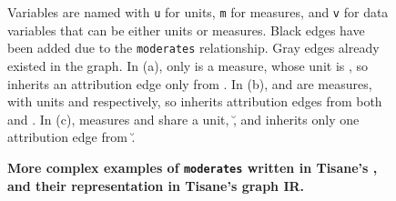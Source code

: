 {\begin{figure}[H]
       \caption{\textbf{More complex examples of \texttt{moderates} written in Tisane's \SDSLlong, and their representation in Tisane's graph IR.}}
        \begin{small}
        \begin{minipage}{\linewidth}
            Variables are named with \texttt{u} for units, \texttt{m} for measures, and \texttt{v} for data variables that can be either units or measures. Black edges have been added due to the \texttt{moderates} relationship. Gray edges already existed in the graph. In (a), only \mone is a measure, whose unit is \utwo, so \umone inherits an attribution edge only from \utwo. In (b), \mone and \mtwo are measures, with units \uone and \utwo respectively, so \monetwo inherits attribution edges from both \uone and \utwo. In (c), measures \mone and \mtwo share a unit, \u, and \monetwo inherits only one attribution edge from \u.
        \end{minipage}
        \end{small}
       \label{fig:figureComplexModeratesGraphIR}
   \end{figure}
}


